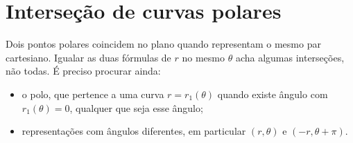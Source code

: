 \documentclass[11pt,a4paper]{article}
\begin{document}
\section{Interseção de curvas polares}

Dois pontos polares coincidem no plano quando representam o mesmo par cartesiano. Igualar as duas fórmulas de \(r\) no mesmo \(\theta\) acha algumas interseções, não todas. É preciso procurar ainda:
\begin{itemize}
\item o polo, que pertence a uma curva \(r=r_{1}(\theta)\) quando existe ângulo com \(r_{1}(\theta)=0\), qualquer que seja esse ângulo;
\item representações com ângulos diferentes, em particular \((r,\theta)\) e \((-r,\theta+\pi)\).
\end{itemize}
\end{document}
